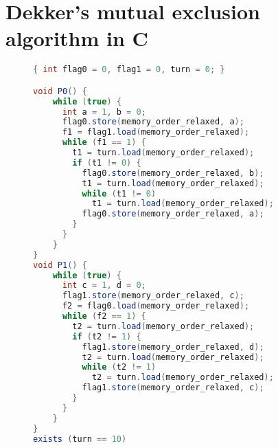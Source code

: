 \section{Dekker's mutual exclusion algorithm in C}
\label{apx:dekker}


\begin{figure}[H]
\begin{lstlisting}[language=Java,morekeywords={memory_order_relaxed}]
{ int flag0 = 0, flag1 = 0, turn = 0; }

void P0() {
    while (true) {
      int a = 1, b = 0;
      flag0.store(memory_order_relaxed, a);
      f1 = flag1.load(memory_order_relaxed);
      while (f1 == 1) {
        t1 = turn.load(memory_order_relaxed);
        if (t1 != 0) {
          flag0.store(memory_order_relaxed, b);
          t1 = turn.load(memory_order_relaxed);
          while (t1 != 0)
            t1 = turn.load(memory_order_relaxed);
          flag0.store(memory_order_relaxed, a);
        }
      }
    }
}
void P1() {
    while (true) {
      int c = 1, d = 0;
      flag1.store(memory_order_relaxed, c);
      f2 = flag0.load(memory_order_relaxed);
      while (f2 == 1) {
        t2 = turn.load(memory_order_relaxed);
        if (t2 != 1) {
          flag1.store(memory_order_relaxed, d);
          t2 = turn.load(memory_order_relaxed);
          while (t2 != 1)
            t2 = turn.load(memory_order_relaxed);
          flag1.store(memory_order_relaxed, c);
        }
      }
    }
}
exists (turn == 10)
\end{lstlisting}
\end{figure}